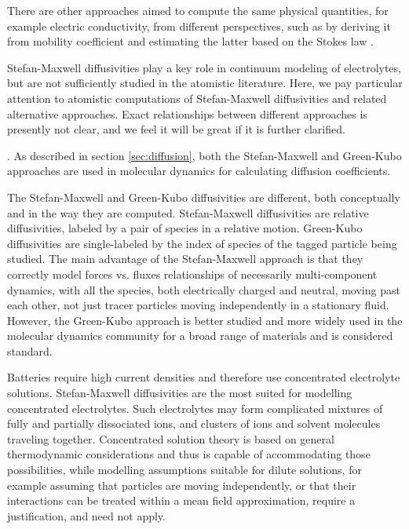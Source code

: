\documentclass[../main.tex]{subfiles}
\begin{document}
There are other approaches aimed to compute the same physical quantities, for example electric conductivity, from different perspectives, such as by deriving it from mobility coefficient and estimating the latter based on the Stokes law \cite{Gering2017}.

Stefan-Maxwell diffusivities play a key role in continuum modeling of electrolytes, but are not sufficiently studied in the atomistic literature. Here, we pay particular attention to atomistic computations of Stefan-Maxwell diffusivities and related alternative approaches. Exact relationships between different approaches is presently not clear, and we feel it will be great if it is further clarified. %

.
As described in section \ref{sec:diffusion}, both the Stefan-Maxwell and Green-Kubo approaches are used in molecular dynamics for calculating diffusion coefficients.  %

The Stefan-Maxwell and Green-Kubo diffusivities are different, both conceptually and in the way they are computed. Stefan-Maxwell diffusivities are relative diffusivities, labeled by a pair of species in a relative motion. Green-Kubo diffusivities are single-labeled by the index of species of the tagged particle being studied. The main advantage of the Stefan-Maxwell approach is that they correctly model forces vs. fluxes relationships of necessarily multi-component dynamics, with all the species, both electrically charged and neutral, moving past each other, not just tracer particles moving independently in a stationary fluid. However, the Green-Kubo approach is better studied and more widely used in the molecular dynamics community for a broad range of materials and is considered standard.

Batteries require high current densities and therefore use concentrated electrolyte solutions. Stefan-Maxwell diffusivities are the most suited for modelling concentrated electrolytes. Such electrolytes may form complicated mixtures of fully and partially dissociated ions, and clusters of ions and solvent molecules traveling together. Concentrated solution theory is based on general thermodynamic considerations and thus is capable of accommodating those possibilities, while modelling assumptions suitable for dilute solutions, for example assuming that particles are moving independently, or that their interactions can be treated within a mean field approximation, require a justification, and need not apply.
\end{document}
